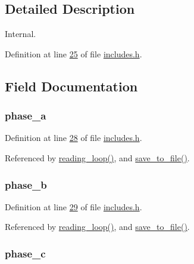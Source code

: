 \subsection{Detailed Description}
Internal. 

Definition at line \hyperlink{a00037_source_l00025}{25} of file \hyperlink{a00037_source}{includes.\-h}.



\subsection{Field Documentation}
\hypertarget{a00029_ad7205e9853a503d2fab0697f5a301f6c}{
\subsubsection[{phase\-\_\-a}]{ phase\-\_\-a}}\label{d5/d16/a00029_ad7205e9853a503d2fab0697f5a301f6c}


Definition at line \hyperlink{a00037_source_l00028}{28} of file \hyperlink{a00037_source}{includes.\-h}.



Referenced by \hyperlink{a00035_source_l00302}{reading\-\_\-loop()}, and \hyperlink{a00035_source_l00421}{save\-\_\-to\-\_\-file()}.

\hypertarget{a00029_a48734adeb4d59d056b6e39c6e08fe21e}{
\subsubsection[{phase\-\_\-b}]{ phase\-\_\-b}}\label{d5/d16/a00029_a48734adeb4d59d056b6e39c6e08fe21e}


Definition at line \hyperlink{a00037_source_l00029}{29} of file \hyperlink{a00037_source}{includes.\-h}.



Referenced by \hyperlink{a00035_source_l00302}{reading\-\_\-loop()}, and \hyperlink{a00035_source_l00421}{save\-\_\-to\-\_\-file()}.

\hypertarget{a00029_ad8892f27909cf51f7603adfc00d224df}{
\subsubsection[{phase\-\_\-c}]{ phase\-\_\-c}}\label{d5/d16/a00029_ad8892f27909cf51f7603adfc00d224df}


